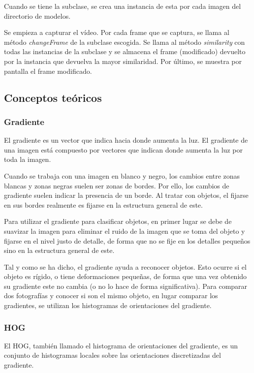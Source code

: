 \documentclass[12pt]{article}
\begin{document}
Cuando se tiene la subclase, se crea una instancia de esta por cada imagen del directorio de modelos.

Se empieza a capturar el vídeo. Por cada frame que se captura, se llama al método \textit{changeFrame} de la subclase escogida. Se llama al método \textit{similarity} con todas las instancias de la subclase y se almacena el frame (modificado) devuelto por la instancia que devuelva la mayor similaridad. Por último, se muestra por pantalla el frame modificado.

\subsection*{Conceptos teóricos}
\subsubsection*{Gradiente}
El gradiente es un vector que indica hacia donde aumenta la luz. El gradiente de una imagen está compuesto por vectores que indican donde aumenta la luz por toda la imagen.

Cuando se trabaja con una imagen en blanco y negro, los cambios entre zonas blancas y zonas negras suelen ser zonas de bordes. Por ello, los cambios de gradiente suelen indicar la presencia de un borde. Al tratar con objetos, el fijarse en sus bordes realmente es fijarse en la estructura general de este.

Para utilizar el gradiente para clasificar objetos, en primer lugar se debe de suavizar la imagen para eliminar el ruido de la imagen que se toma del objeto y fijarse en el nivel justo de detalle, de forma que no se fije en los detalles pequeños sino en la estructura general de este.

Tal y como se ha dicho, el gradiente ayuda a reconocer objetos. Esto ocurre si el objeto es rígido, o tiene deformaciones pequeñas, de forma que una vez obtenido su gradiente este no cambia (o no lo hace de forma significativa). Para comparar dos fotografías y conocer si son el mismo objeto, en lugar comparar los gradientes, se utilizan los histogramas de orientaciones del gradiente.

\subsubsection*{HOG}

El HOG, también llamado el histograma de orientaciones del gradiente, es un conjunto de histogramas locales sobre las orientaciones discretizadas del gradiente.
\end{document}
